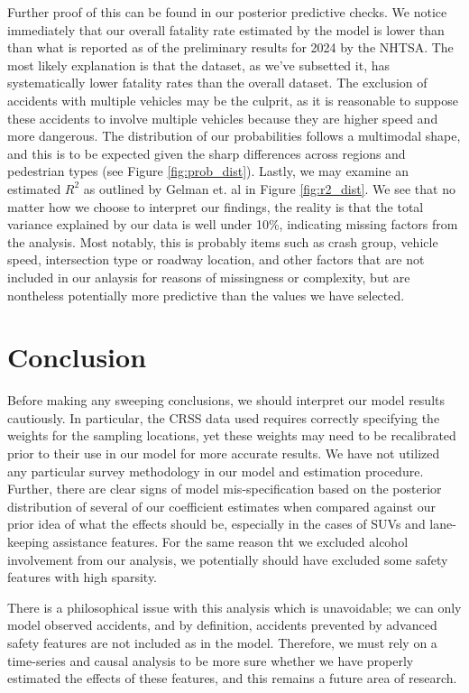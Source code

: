 \documentclass[12pt]{article}
\begin{document}
Further proof of this can be found in our posterior predictive checks. We notice immediately that our overall fatality
rate estimated by the model is lower than than what is reported as of the preliminary results for 2024 by the NHTSA. 
The most likely explanation is that the dataset, as we've subsetted
it, has systematically lower fatality rates than the overall dataset. The exclusion of accidents
with multiple vehicles may be the culprit, as it is reasonable to suppose these accidents to involve
multiple vehicles because they are higher speed and more dangerous. The distribution of our probabilities follows
a multimodal shape, and this is to be expected given the sharp differences across regions
and pedestrian types (see Figure \ref{fig:prob_dist}). Lastly, we may examine an estimated $R^2$ as outlined by
Gelman et. al\cite{gelman_r-squared_2019} in Figure \ref{fig:r2_dist}. We see that no matter how we choose to interpret
our findings, the reality is that the total variance explained by our data is well under 10\%, indicating missing factors
from the analysis. Most notably, this is probably items such as crash group, vehicle
speed, intersection type or roadway location, and other factors that are not included in our anlaysis for reasons
of missingness or complexity, but are nontheless potentially more predictive than the values we have selected.

\section{Conclusion}

Before making any sweeping conclusions, we should interpret our model results cautiously. In particular, the CRSS
data used requires correctly specifying the weights for the sampling locations, yet these weights may need to be
recalibrated prior to their use in our model for more accurate results. We have not utilized any particular
survey methodology in our model and estimation procedure. Further, there are clear signs of model mis-specification
based on the posterior distribution of several of our coefficient estimates when compared against our prior idea of what
the effects should be, especially in the cases of SUVs and lane-keeping assistance features. For the same reason tht we
excluded alcohol involvement from our analysis, we potentially should have excluded some safety features with high 
sparsity.

There is a philosophical issue with this analysis which is unavoidable; we can only model 
observed accidents, and by definition, accidents prevented by advanced safety features are not included
as in the model. Therefore, we must rely on a time-series and causal analysis to be more
sure whether we have properly estimated the effects of these features, and this remains a future area of
research.
\end{document}
